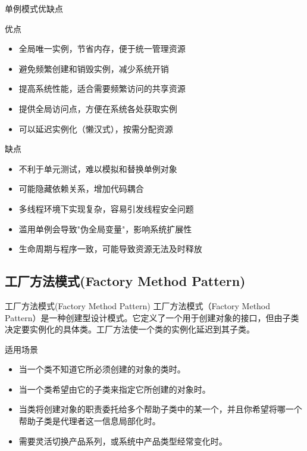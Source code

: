 \documentclass[UTF8,aspectratio=169]{beamer}
\begin{document}
\begin{frame}{单例模式优缺点}
    \begin{ytublock}{优点}
        \begin{itemize}
            \item 全局唯一实例，节省内存，便于统一管理资源
            \item 避免频繁创建和销毁实例，减少系统开销
            \item 提高系统性能，适合需要频繁访问的共享资源
            \item 提供全局访问点，方便在系统各处获取实例
            \item 可以延迟实例化（懒汉式），按需分配资源
        \end{itemize}
    \end{ytublock}
    \begin{alertytublock}{缺点}
        \begin{itemize}
            \item 不利于单元测试，难以模拟和替换单例对象
            \item 可能隐藏依赖关系，增加代码耦合
            \item 多线程环境下实现复杂，容易引发线程安全问题
            \item 滥用单例会导致"伪全局变量"，影响系统扩展性
            \item 生命周期与程序一致，可能导致资源无法及时释放
        \end{itemize}
    \end{alertytublock}
\end{frame}

\subsection{工厂方法模式(Factory Method Pattern)}

\begin{frame}{工厂方法模式(Factory Method Pattern)}
    工厂方法模式（Factory Method Pattern）是一种创建型设计模式。它定义了一个用于创建对象的接口，但由子类决定要实例化的具体类。工厂方法使一个类的实例化延迟到其子类。
    \begin{ytublock}{适用场景}
        \begin{itemize}
            \item 当一个类不知道它所必须创建的对象的类时。
            \item 当一个类希望由它的子类来指定它所创建的对象时。
            \item 当类将创建对象的职责委托给多个帮助子类中的某一个，并且你希望将哪一个帮助子类是代理者这一信息局部化时。
            \item 需要灵活切换产品系列，或系统中产品类型经常变化时。
        \end{itemize}
    \end{ytublock}
\end{frame}
\end{document}
